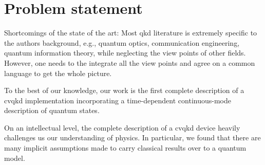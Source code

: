 \section{Problem statement}

Shortcomings of the state of the art:
 Most \gls{qkd} literature is extremely specific to the authors background, e.g., quantum optics, communication engineering, quantum information theory, while neglecting the view points of other fields.
However, one needs to the integrate all the view points and agree on a common language to get the whole picture.

To the best of our knowledge, our work is the first complete description of a \gls{cvqkd} implementation incorporating a time-dependent continuous-mode description of quantum states.

On an intellectual level, the complete description of a \gls{cvqkd} device heavily challenges us our understanding of physics.
In particular, we found that there are many implicit assumptions made to carry classical results over to a quantum model.